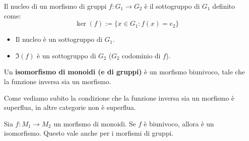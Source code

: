 \documentclass[../main.tex]{subfiles}
\begin{document}
\begin{remark}
    Il nucleo di un morfismo di gruppi $f: G_1 \rightarrow G_2$ è il sottogruppo di $G_1$ definito come:
    \[
        \ker(f):= \{x \in G_1 : f(x) = e_2\}
    \]
    \begin{itemize}
        \item Il nucleo è un sottogruppo di $G_1$.
        \item $\Im(f)$ è un sottogruppo di $G_2$ ($G_2$ codominio di $f$).
    \end{itemize}
\end{remark}

\begin{definition}[Isomorfismo]
    Un \textbf{isomorfismo di monoidi (e di gruppi)} è un morfismo biunivoco, tale che la funzione inversa sia un morfismo.
\end{definition}

Come vediamo subito la condizione che la funzione inversa sia un morfismo è superflua, in altre categorie non è superflua.

\begin{proposition}
    Sia $f: M_1 \rightarrow M_2$ un morfismo di monoidi. Se $f$ è biunivoco, allora è un isomorfismo. Questo vale anche per i morfismi di gruppi.
\end{proposition}
\end{document}
